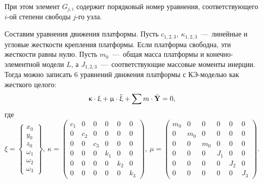 При этом элемент $ G_{j,i} $ содержит порядковый номер уравнения, соответствующего $ i $-ой степени свободы $ j $-го узла.

Составим уравнения движения платформы. Пусть $ c_{1,2,3}, \ \kappa_{1,2,3} $~---~линейные и угловые жесткости крепления платформы. Если платформа свободна, эти жесткости равны нулю. Пусть $ m_0 $~---~общая масса платформы и конечно-элементной модели $ L $, а  $ J_{1,2,3} $~---~соответствующие массовые моменты инерции. Тогда можно записать 6 уравнений движения платформы с КЭ-моделью как жесткого целого:
\begin{equation}
	\upkappa \cdot \upxi + \upmu \cdot \ddot{\upxi} + \sum m \cdot \ddot{\mathbf{Y}} = 0,
	\label{eq:motionPlatform}
\end{equation}
где
\begin{equation*}
	\xi =
	\begin{Bmatrix}
		x_0 \\ y_0 \\ z_0 \\ \omega_1 \\ \omega_2 \\ \omega_3
	\end{Bmatrix}, \
	\kappa =
	\begin{pmatrix}
		c_1 & 0 & 0 & 0 & 0 & 0 \\
		0 & c_2 & 0 & 0 & 0 & 0 \\
		0 & 0 & c_3 & 0 & 0 & 0 \\
		0 & 0 & 0 & k_1 & 0 & 0 \\
		0 & 0 & 0 & 0 & k_2 & 0 \\
		0 & 0 & 0 & 0 & 0 & k_3
	\end{pmatrix}, \ 
	\mu =
	\begin{pmatrix}
		m_0 & 0 & 0 & 0 & 0 & 0 \\
		0 & m_0 & 0 & 0 & 0 & 0 \\
		0 & 0 & m_0 & 0 & 0 & 0 \\
		0 & 0 & 0 & J_1 & 0 & 0 \\
		0 & 0 & 0 & 0 & J_2 & 0 \\
		0 & 0 & 0 & 0 & 0 & J_3
	\end{pmatrix}.
\end{equation*}

